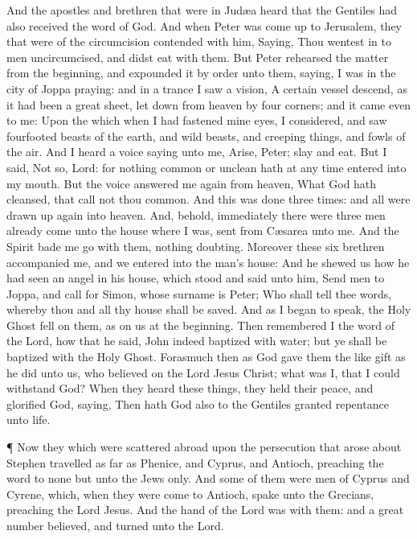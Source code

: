  And the apostles and brethren that were in Judæa heard that
the Gentiles had also received the word of God.  And when
Peter was come up to Jerusalem, they that were of the circumcision
contended with him,  Saying, Thou wentest in to men
uncircumcised, and didst eat with them.  But Peter rehearsed
the matter from the beginning, and expounded it by order unto them,
saying,  I was in the city of Joppa praying: and in a trance
I saw a vision, A certain vessel descend, as it had been a great sheet,
let down from heaven by four corners; and it came even to me:
 Upon the which when I had fastened mine eyes, I considered,
and saw fourfooted beasts of the earth, and wild beasts, and creeping
things, and fowls of the air.  And I heard a voice saying
unto me, Arise, Peter; slay and eat.  But I said, Not so,
Lord: for nothing common or unclean hath at any time entered into my
mouth.  But the voice answered me again from heaven, What
God hath cleansed, that call not thou common.  And this was
done three times: and all were drawn up again into heaven. 
And, behold, immediately there were three men already come unto the
house where I was, sent from Cæsarea unto me.  And the
Spirit bade me go with them, nothing doubting. Moreover these six
brethren accompanied me, and we entered into the man's house:
 And he shewed us how he had seen an angel in his house,
which stood and said unto him, Send men to Joppa, and call for Simon,
whose surname is Peter;  Who shall tell thee words, whereby
thou and all thy house shall be saved.  And as I began to
speak, the Holy Ghost fell on them, as on us at the beginning.
 Then remembered I the word of the Lord, how that he said,
John indeed baptized with water; but ye shall be baptized with the Holy
Ghost.  Forasmuch then as God gave them the like gift as he
did unto us, who believed on the Lord Jesus Christ; what was I, that I
could withstand God?  When they heard these things, they
held their peace, and glorified God, saying, Then hath God also to the
Gentiles granted repentance unto life.

 ¶ Now they which were scattered abroad upon the
persecution that arose about Stephen travelled as far as Phenice, and
Cyprus, and Antioch, preaching the word to none but unto the Jews only.
 And some of them were men of Cyprus and Cyrene, which,
when they were come to Antioch, spake unto the Grecians, preaching the
Lord Jesus.  And the hand of the Lord was with them: and a
great number believed, and turned unto the Lord.

